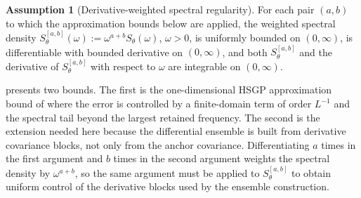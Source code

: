 \documentclass[11pt,a4paper]{article}
\theoremstyle{definition}
\newtheorem{assumption}{Assumption}
\theoremstyle{remark}
\begin{document}
\begin{assumption}[Derivative-weighted spectral regularity]\label{ass:subsection-weighted-spectral}
For each pair \((a,b)\) to which the approximation bounds below are applied, the weighted spectral density \(S_\theta^{[a,b]}(\omega):=\omega^{a+b}S_\theta(\omega)\), \(\omega>0\), is uniformly bounded on \((0,\infty)\), is differentiable with bounded derivative on \((0,\infty)\), and both \(S_\theta^{[a,b]}\) and the derivative of \(S_\theta^{[a,b]}\) with respect to \(\omega\) are integrable on \((0,\infty)\).
\end{assumption}

 presents two bounds. The first is the one-dimensional HSGP approximation bound of \citet{solin2020hilbert} where the error is controlled by a finite-domain term of order \(L^{-1}\) and the spectral tail beyond the largest retained frequency. The second is the extension needed here because the differential ensemble is built from derivative covariance blocks, not only from the anchor covariance. Differentiating \(a\) times in the first argument and \(b\) times in the second argument weights the spectral density by \(\omega^{a+b}\), so the same argument must be applied to \(S_\theta^{[a,b]}\) to obtain uniform control of the derivative blocks used by the ensemble construction.
\end{document}
